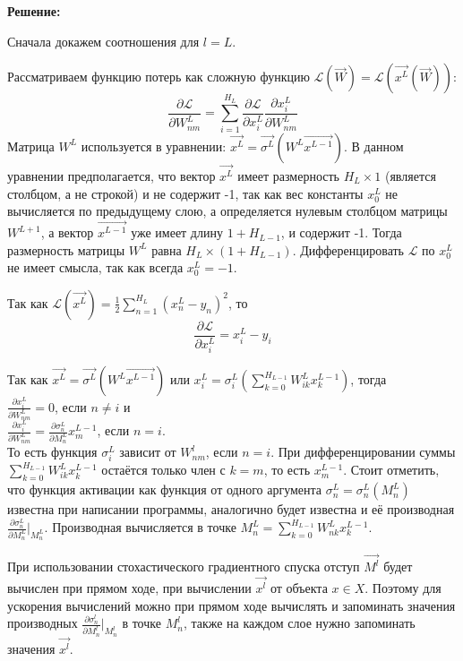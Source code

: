 \textbf{Решение:}

Сначала докажем соотношения для $l = L$.

Рассматриваем функцию потерь как сложную функцию $\mathcal{L} (\overrightarrow{W}) = \mathcal{L}(\overrightarrow{x^L}(\overrightarrow{W}))$:
$$
	\frac{\partial \mathcal{L}}{\partial {W^{L}_{nm}}} = \sum\limits_{i = 1}^{H_L} \frac{\partial \mathcal{L}}{\partial x^L_i} \frac{\partial x^L_i}{\partial W^L_{nm}}
$$
Матрица $W^{L}$ используется в уравнении: $\overrightarrow{x^L} = \overrightarrow{\sigma^L} (W^L \overrightarrow{x^{L-1}})$. В данном уравнении предполагается, что вектор $\overrightarrow{x^L}$ имеет размерность $H_L \times 1$ (является столбцом, а не строкой) и не содержит -1, так как вес константы $x^L_0$ не вычисляется по предыдущему слою, а определяется нулевым столбцом матрицы $W^{L+1}$, а вектор $\overrightarrow{x^{L-1}}$ уже имеет длину $1+H_{L-1}$, и содержит -1. Тогда размерность матрицы $W^{L}$ равна $H_L \times (1+H_{L-1})$. Дифференцировать $\mathcal{L}$ по $x^L_0$ не имеет смысла, так как всегда $x^L_0 = -1$.

Так как $\mathcal{L} (\overrightarrow{x^L}) = \frac{1}{2} \sum\limits_{n = 1}^{H_L} (x^L_n - y_n)^2$, то
$$
	\frac{\partial \mathcal{L}}{\partial x^L_i} = x^L_i - y_i
$$

Так как $\overrightarrow{x^L} = \overrightarrow{\sigma^L}(W^L \overrightarrow{x^{L-1}})$ или $x^L_i = \sigma^L_i\left(\sum\limits_{k = 0}^{H_{L-1}} W^{L}_{ik} x^{L-1}_k\right)$, тогда \\
$\frac{\partial x^L_i}{\partial W^L_{nm}} = 0$, если $n \neq i$ и \\
$\frac{\partial x^L_i}{\partial W^L_{nm}} = \frac{\partial \sigma^L_n}{\partial M^L_n} x^{L-1}_m$, если $n = i$. \\
То есть функция $\sigma^L_i$ зависит от $W^l_{nm}$, если $n = i$. При дифференцировании суммы $\sum\limits_{k = 0}^{H_{L-1}} W^{L}_{ik} x^{L-1}_k$ остаётся только член с $k = m$, то есть $x^{L-1}_m$. Стоит отметить, что функция активации как функция от одного аргумента $\sigma^L_n = \sigma^L_n(M^L_n)$ известна при написании программы, аналогично будет известна и её производная $\frac{\partial \sigma^L_n}{\partial M^L_n}\Big|_{M^L_n}$. Производная вычисляется в точке $M^L_n = \sum\limits_{k = 0}^{H_{L-1}} W^{L}_{nk} x^{L-1}_k$.

При использовании стохастического градиентного спуска отступ $\overrightarrow{M^l}$ будет вычислен при прямом ходе, при вычислении $\overrightarrow{x^l}$ от объекта $x \in X$. Поэтому для ускорения вычислений можно при прямом ходе вычислять и запоминать значения производных $\frac{\partial \sigma^l_n}{\partial M^l_n}\Big|_{M^l_n}$ в точке $M^l_n$, также на каждом слое нужно запоминать значения $\overrightarrow{x^l}$.

